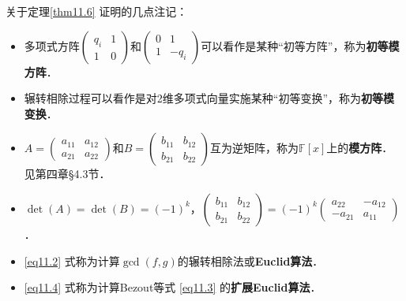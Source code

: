 \documentclass[a4paper,fontset=windows]{ctexbook}
\theoremstyle{definition}
\def\note{\noindent\raisebox{10pt}{\dbend}\hspace{7pt}}
\begin{document}
\note 关于定理\ref{thm11.6} 证明的几点注记：
\begin{itemize}
\item 多项式方阵$\begin{pmatrix}q_i&1 \\ 1&0\end{pmatrix}$和$\begin{pmatrix}0&1 \\ 1&-q_i\end{pmatrix}$可以看作是某种“初等方阵”，称为{\bf 初等模方阵}．

\item 辗转相除过程可以看作是对2维多项式向量实施某种“初等变换”，称为{\bf 初等模变换}．

\item $A=\begin{pmatrix}a_{11}&a_{12} \\ a_{21}&a_{22}\end{pmatrix}$和$B=\begin{pmatrix}b_{11}&b_{12} \\ b_{21}&b_{22}\end{pmatrix}$互为逆矩阵，称为$\mathbb{F}[x]$上的{\bf 模方阵}．见第四章\S 4.3节．

\item $\det(A)=\det(B)=(-1)^k$，$\begin{pmatrix}b_{11}&b_{12} \\ b_{21}&b_{22}\end{pmatrix}=(-1)^k\begin{pmatrix}a_{22}&-a_{12} \\ -a_{21}&a_{11}\end{pmatrix}$．

\item \eqref{eq11.2} 式称为计算$\gcd(f,g)$的辗转相除法或{\bf Euclid算法}．

\item \eqref{eq11.4} 式称为计算Bezout等式 \eqref{eq11.3} 的{\bf 扩展Euclid算法}．


\end{itemize}
\end{document}
